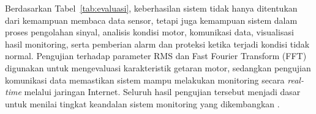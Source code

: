 \documentclass{elsinta}
\begin{document}
Berdasarkan Tabel~\ref{tab:evaluasi}, keberhasilan sistem tidak hanya ditentukan dari kemampuan membaca data sensor, tetapi juga kemampuan sistem dalam proses pengolahan sinyal, analisis kondisi motor, komunikasi data, visualisasi hasil monitoring, serta pemberian alarm dan proteksi ketika terjadi kondisi tidak normal. Pengujian terhadap parameter RMS dan Fast Fourier Transform (FFT) digunakan untuk mengevaluasi karakteristik getaran motor, sedangkan pengujian komunikasi data memastikan sistem mampu melakukan monitoring secara \textit{real-time} melalui jaringan Internet. Seluruh hasil pengujian tersebut menjadi dasar untuk menilai tingkat keandalan sistem monitoring yang dikembangkan \cite{oppenheim2010,randall2011,mqtt311}.

\section{\ProposedSolutionTitle}



\subsection{\ArchitectureTitle}

\end{document}
